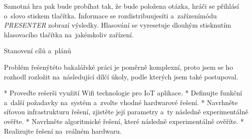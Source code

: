 Samotná hra pak bude probíhat tak, že bude položena otázka, hráči se přihlásí o~slovo stiskem tlačítka. Informace se rozdistribuujesíti a~zařízenímódu {\em PRESENTER} zobrazí výsledky. Hlasování se vyresetuje dlouhým stisknutím hlasovacího tlačítka na~jakémkoliv zařízení.

\sec Stanovení cílů a~plánů

Problém řešenýtéto bakalářské práci je poměrně komplexní, proto jsem se ho rozhodl rozložit na~následující dílčí úkoly, podle kterých jsem také postupoval.

\begitems
* Proveďte rešerši využití Wifi technologie pro IoT aplikace.
* Definujte funkční a~další požadavky na~systém a~zvolte vhodné hardwarové řešení.
* Navrhněte síťovou infrastrukturu řešení, zjistěte její parametry a~ty následně experimentálně ověřte.
* Navrhněte algoritmické řešení, které následně experimentálně ověříte.
* Realizujte řešení na~reálném hardwaru. 

\enditems